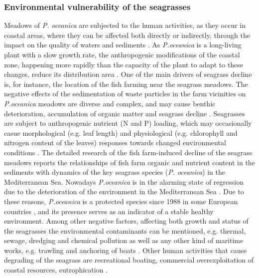 \documentclass[11pt]{article}
\begin{document}
\subsubsection{Environmental vulnerability of the seagrasses}
Meadows of \textit{P. oceanica} are subjected to the human activities, as they occur in coastal areas, where
they can be affected both directly \cite{Meinesz91}\label{Meinesz91} or indirectly, through the impact on the
quality of waters and sediments \cite{Duarte02}\label{Duarte02}. As \textit{P.oceanica} is a long-living plant with a slow
growth rate, the anthropogenic modifications of the coastal zone, happening more rapidly than the
capacity of the plant to adapt to these changes, reduce its distribution area \cite{Micheli05}\label{Micheli05}. 
One of the main drivers of seagrass decline is, for instance, the location of the fish farming near the
seagrass meadows. The negative effects of the sedimentation of waste particles in the farm vicinities
on \textit{P.oceanica} meadows are diverse and complex, and may cause benthic deterioration, accumulation
of organic matter and seagrass decline \cite{Holmer08}\label{Holmer08}. Seagrasses are subject to anthropogenic
nutrient (N and P) loading, which may occasionally casue morphological (e.g. leaf length) and
physiological (e.g. chlorophyll and nitrogen content of the leaves) responses towards changed
environmental conditions \cite{Leoni06,Leoni07}\label{Leoni06} \label{Leoni07}. 
The detailed research of the fish
farm-induced decline of the seagrass meadows \cite{Diaz-Almela06}\label{Diaz-Almela06}reports the relationships of
fish farm organic and nutrient content in the sediments with dynamics of the key seagrass species (\textit{P.
oceanica}) in the Mediterranean Sea. Nowadays \textit{P.oceanica} is in the alarming state of regression due
to the deterioration of the environment in the Mediterranean Sea \cite{Ribed02}\label{Ribed02}. Due to these reasons,
\textit{P.oceanica} is a protected species since 1988 in some European countries \cite{Francour99}\label{Francour99}, and
its presence serves as an indicator of a stable healthy environment. Among other negative factors,
affecting both growth and status of the seagrasses the environmental contaminants can be mentioned,
e.g. thermal, sewage, dredging and chemical pollution  as well as any other kind of maritime works,
e.g. trawling and anchoring of boats \cite{Ribed02}\label{Ribed02}. Other human activities that cause degrading of the
seagrass are recreational boating, commercial overexploitation of coastal resources, eutrophication
\cite{McKenzie06}\label{McKenzie06}.
\end{document}
